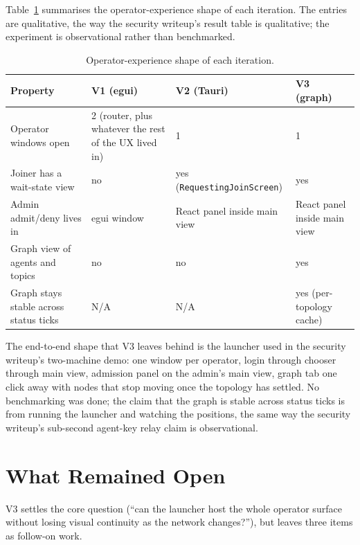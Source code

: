 \documentclass[11pt,a4paper]{article}
\begin{document}
Table~\ref{tab:ui-iter-result-shape} summarises the
operator-experience shape of each iteration. The entries are
qualitative, the way the security writeup's result table is
qualitative; the experiment is observational rather than
benchmarked.

\begin{table}[H]
  \centering
  \small
  \begin{tabular}{|p{4.6cm}|p{2.2cm}|p{2.6cm}|p{4cm}|}
    \hline
    \rowcolor{gray!15}
    \textbf{Property} & \textbf{V1 (egui)} & \textbf{V2 (Tauri)} & \textbf{V3 (graph)} \\
    \hline
    Operator windows open & 2 (router, plus whatever the rest of the UX lived in) & 1 & 1 \\
    \hline
    Joiner has a wait-state view & no & yes (\texttt{RequestingJoinScreen}) & yes \\
    \hline
    Admin admit/deny lives in & egui window & React panel inside main view & React panel inside main view \\
    \hline
    Graph view of agents and topics & no & no & yes \\
    \hline
    Graph stays stable across status ticks & N/A & N/A & yes (per-topology cache) \\
    \hline
  \end{tabular}
  \caption{Operator-experience shape of each iteration.}
  \label{tab:ui-iter-result-shape}
\end{table}

The end-to-end shape that V3 leaves behind is the launcher used
in the security writeup's two-machine demo: one window per
operator, login through chooser through main view, admission
panel on the admin's main view, graph tab one click away with
nodes that stop moving once the topology has settled. No
benchmarking was done; the claim that the graph is stable across
status ticks is from running the launcher and watching the
positions, the same way the security writeup's sub-second
agent-key relay claim is observational.

\section{What Remained Open}

V3 settles the core question (``can the launcher host the whole
operator surface without losing visual continuity as the network
changes?''), but leaves three items as follow-on work.
\end{document}

